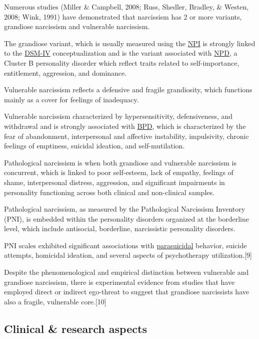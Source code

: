 \documentclass[oneside]{book}
\numberwithin{equation}{section}
\begin{document}
%
Numerous studies (Miller \& Campbell, 2008; Russ, Shedler, Bradley, \& Westen, 2008; Wink, 1991) have demonstrated that narcissism has 2 or more variants, grandiose narcissism and vulnerable narcissism.

The grandiose variant, which is usually measured using the \href{https://en.wikipedia.org/wiki/Narcissistic_Personality_Inventory}{NPI} is strongly linked to the \href{https://en.wikipedia.org/wiki/Diagnostic_and_Statistical_Manual_of_Mental_Disorders}{DSM-IV} conceptualization and is the variant associated with \href{https://en.wikipedia.org/wiki/Narcissistic_personality_disorder}{NPD}, a Cluster B personality disorder which reflect traits related to self-importance, entitlement, aggression, and dominance.

Vulnerable narcissism reflects a defensive and fragile grandiosity, which functions mainly as a cover for feelings of inadequacy.

Vulnerable narcissism characterized by hypersensitivity, defensiveness, and withdrawal and is strongly associated with \href{https://en.wikipedia.org/wiki/Borderline_personality_disorder}{BPD}, which is characterized by the fear of abandonment, interpersonal and affective instability, impulsivity, chronic feelings of emptiness, suicidal ideation, and self-mutilation.

Pathological narcissism is when both grandiose and vulnerable narcissism is concurrent, which is linked to poor self-esteem, lack of empathy, feelings of shame, interpersonal distress, aggression, and significant impairments in personality functioning across both clinical and non-clinical samples.

Pathological narcissism, as measured by the Pathological Narcissism Inventory (PNI), is embedded within the personality disorders organized at the borderline level, which include antisocial, borderline, narcissistic personality disorders.

PNI scales exhibited significant associations with \href{https://en.wikipedia.org/wiki/Parasuicidal}{parasuicidal} behavior, suicide attempts, homicidal ideation, and several aspects of psychotherapy utilization.[9]

Despite the phenomenological and empirical distinction between vulnerable and grandiose narcissism, there is experimental evidence from studies that have employed direct or indirect ego-threat to suggest that grandiose narcissists have also a fragile, vulnerable core.[10]

\subsection{Clinical \& research aspects}
\end{document}

